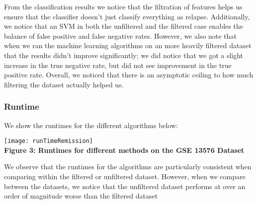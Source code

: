 \documentclass[12pt]{scrartcl}
\begin{document}
    From the classification results we notice that the filtration of features helps us ensure that the classifier doesn't just classify everything as relapse. Additionally, we notice that an SVM in both the unfiltered and the filtered case enables the balance of false positive and false negative rates. However, we also note that when we ran the machine learning algorithms on an  more heavily filtered dataset that the results didn't improve significantly; we did notice that we got a slight increase in the true negative rate, but did not see improvement in the true positive rate. Overall, we noticed that there is an asymptotic ceiling to how much filtering the dataset actually helped us. 
   
    \subsubsection{Runtime}
    We show the runtimes for the different algorithms below:
    
    \begin{center}
    \texttt{[image: runTimeRemission]}\\
    \textbf{Figure 3: Runtimes for different methods on the GSE 13576 Dataset}
    \end{center}
    
    We observe that the runtimes for the algorithms are particularly consistent when comparing within the filtered or unfiltered dataset. However, when we compare between the datasets, we notice that the unfiltered dataset performs at over an order of magnitude worse than the filtered dataset
    
\end{document}
